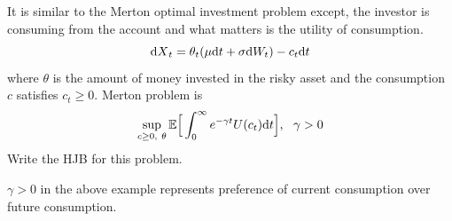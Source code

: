 \documentclass[11pt]{book}
\newcommand{\dt}{\text{\normalfont d}t}
\newcommand{\dX}{\text{\normalfont d}X}
\newcommand{\dW}{\text{\normalfont d}W}
\begin{document}
\begin{ex}
    {}
    It is similar to the Merton optimal investment problem except, the investor is consuming from the account and what matters is the utility of consumption.
    \begin{equation}
        {\dX}_t=\theta_t(\mu {{\dt}}+ \sigma \dW_t)-c_t{{\dt}}
    \end{equation}
    where $\theta$ is the amount of money invested in the risky asset and the consumption $c$ satisfies $c_t\ge0$.
    Merton problem is 
    \begin{equation}
        \sup_{c\ge0,~\theta}\mathbb{E}\Big[\int_0^\infty e^{-\gamma t}U(c_t){\dt}\Big], ~~\gamma>0
    \end{equation}
    Write the HJB for this problem.
\end{ex}
\begin{rem}
    $\gamma>0$ in the above example represents preference of current consumption over future consumption.
\end{rem}
\end{document}

